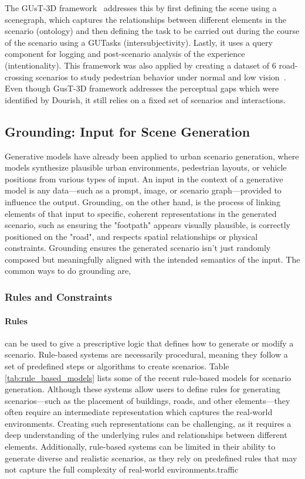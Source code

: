 \documentclass{article}
\begin{document}
The GUsT-3D framework~\cite{wu2022designing} addresses this by first defining the scene using a scenegraph, which captures the relationships between different elements in the scenario (ontology) and then defining the task to be carried out during the course of the scenario using a GUTasks (intersubjectivity). Lastly, it uses a query component for logging and post-scenario analysis of the experience (intentionality). This framework was also applied by creating a dataset of 6 road-crossing scenarios to study pedestrian behavior under normal and low vision~\cite{wu2023exploring}. Even though GusT-3D framework addresses the perceptual gaps which were identified by Dourish, it still relies on a fixed set of scenarios and interactions.

\subsection{Grounding: Input for Scene Generation}

Generative models have already been applied to urban scenario generation, where models synthesize plausible urban environments, pedestrian layouts, or vehicle positions from various types of input. An input in the context of a generative model is any data—such as a prompt, image, or scenario graph—provided to influence the output. Grounding, on the other hand, is the process of linking elements of that input to specific, coherent representations in the generated scenario, such as ensuring the "footpath" appears visually plausible, is correctly positioned on the "road", and respects spatial relationships or physical constraints. Grounding ensures the generated scenario isn't just randomly composed but meaningfully aligned with the intended semantics of the input. The common ways to do grounding are,

\subsubsection{Rules and Constraints}

\paragraph{Rules} can be used to give a prescriptive logic that defines how to generate or modify a scenario. Rule-based systems are necessarily procedural, meaning they follow a set of predefined steps or algorithms to create scenarios. Table \ref{tab:rule_based_models} lists some of the recent rule-based models for scenario generation. Although these systems allow users to define rules for generating scenarios—such as the placement of buildings, roads, and other elements—they often require an intermediate representation which captures the real-world environments. Creating such representations can be challenging, as it requires a deep understanding of the underlying rules and relationships between different elements. Additionally, rule-based systems can be limited in their ability to generate diverse and realistic scenarios, as they rely on predefined rules that may not capture the full complexity of real-world environments.traffic
\end{document}
